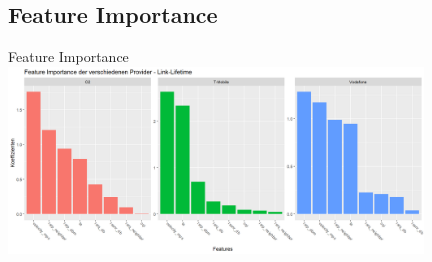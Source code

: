\subsection{Feature Importance}


\begin{frame}{Feature Importance}
\includegraphics[width = 11cm]{plots/link_lifetime/feature_importance}
\end{frame}